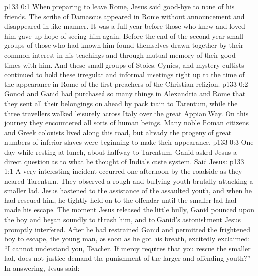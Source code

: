 \author{Midwayer Commission}
\vs p133 0:1 When preparing to leave Rome, Jesus said good\hyp{}bye to none of his friends. The scribe of Damascus appeared in Rome without announcement and disappeared in like manner. It was a full year before those who knew and loved him gave up hope of seeing him again. Before the end of the second year small groups of those who had known him found themselves drawn together by their common interest in his teachings and through mutual memory of their good times with him. And these small groups of Stoics, Cynics, and mystery cultists continued to hold these irregular and informal meetings right up to the time of the appearance in Rome of the first preachers of the Christian religion.
\vs p133 0:2 \pc Gonod and Ganid had purchased so many things in Alexandria and Rome that they sent all their belongings on ahead by pack train to Tarentum, while the three travellers walked leisurely across Italy over the great Appian Way. On this journey they encountered all sorts of human beings. Many noble Roman citizens and Greek colonists lived along this road, but already the progeny of great numbers of inferior slaves were beginning to make their appearance.
\vs p133 0:3 One day while resting at lunch, about halfway to Tarentum, Ganid asked Jesus a direct question as to what he thought of India’s caste system. Said Jesus: 
\vs p133 1:1 A very interesting incident occurred one afternoon by the roadside as they neared Tarentum. They observed a rough and bullying youth brutally attacking a smaller lad. Jesus hastened to the assistance of the assaulted youth, and when he had rescued him, he tightly held on to the offender until the smaller lad had made his escape. The moment Jesus released the little bully, Ganid pounced upon the boy and began soundly to thrash him, and to Ganid’s astonishment Jesus promptly interfered. After he had restrained Ganid and permitted the frightened boy to escape, the young man, as soon as he got his breath, excitedly exclaimed: “I cannot understand you, Teacher. If mercy requires that you rescue the smaller lad, does not justice demand the punishment of the larger and offending youth?” In answering, Jesus said:
